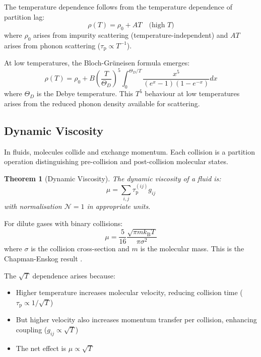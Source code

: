 \documentclass[twocolumn,10pt,aps,prd,superscriptaddress,nofootinbib]{revtex4-2}
\newtheorem{theorem}{Theorem}[section]
\theoremstyle{remark}
\newcommand{\kB}{k_{\mathrm{B}}}
\newcommand{\tauP}{\tau_{\mathrm{p}}}
\newcommand{\Gij}{g_{ij}}
\newcommand{\Norm}{\mathcal{N}}
\begin{document}
The temperature dependence follows from the temperature dependence of partition lag:
\begin{equation}
\rho(T) = \rho_0 + A T \quad \text{(high } T\text{)}
\label{eq:resistivity_temperature}
\end{equation}
where $\rho_0$ arises from impurity scattering (temperature-independent) and $AT$ arises from phonon scattering ($\tauP \propto T^{-1}$).

At low temperatures, the Bloch-Gr\"{u}neisen formula emerges:
\begin{equation}
\rho(T) = \rho_0 + B \left(\frac{T}{\Theta_D}\right)^5 \int_0^{\Theta_D/T} \frac{x^5}{(e^x - 1)(1 - e^{-x})} dx
\label{eq:bloch_gruneisen}
\end{equation}
where $\Theta_D$ is the Debye temperature. This $T^5$ behaviour at low temperatures arises from the reduced phonon density available for scattering.

\subsection{Dynamic Viscosity}

In fluids, molecules collide and exchange momentum. Each collision is a partition operation distinguishing pre-collision and post-collision molecular states.

\begin{theorem}[Dynamic Viscosity]
\label{thm:viscosity}
The dynamic viscosity of a fluid is:
\begin{equation}
\mu = \sum_{i,j} \tauP^{(ij)} \Gij
\label{eq:viscosity}
\end{equation}
with normalisation $\Norm = 1$ in appropriate units.
\end{theorem}

For dilute gases with binary collisions:
\begin{equation}
\mu = \frac{5}{16} \frac{\sqrt{\pi m \kB T}}{\pi \sigma^2}
\label{eq:gas_viscosity}
\end{equation}
where $\sigma$ is the collision cross-section and $m$ is the molecular mass. This is the Chapman-Enskog result \cite{chapman1990}.

The $\sqrt{T}$ dependence arises because:
\begin{itemize}
\item Higher temperature increases molecular velocity, reducing collision time ($\tauP \propto 1/\sqrt{T}$)
\item But higher velocity also increases momentum transfer per collision, enhancing coupling ($\Gij \propto \sqrt{T}$)
\item The net effect is $\mu \propto \sqrt{T}$
\end{itemize}
\end{document}
